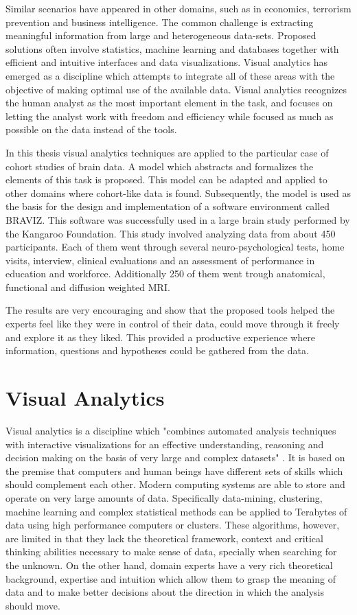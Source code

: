 Similar scenarios have appeared in other domains, such as in economics, terrorism prevention and business intelligence. The common challenge is extracting meaningful information from large and heterogeneous data-sets. Proposed solutions often involve statistics, machine learning and databases together with efficient and intuitive interfaces and data visualizations. Visual analytics has emerged as a discipline which attempts to integrate all of these areas with the objective of making optimal use of the available data. Visual analytics recognizes the human analyst as the most important element in the task, and focuses on letting the analyst work with freedom and efficiency while focused as much as possible on the data instead of the tools.

In this thesis visual analytics techniques are applied to the particular case of cohort studies of brain data. A model which abstracts and formalizes the elements of this task is proposed. This model can be adapted and applied to other domains where cohort-like data is found. Subsequently, the model is used as the basis for the design and implementation of a software environment called BRAVIZ. This software was successfully used in a large brain study performed by the Kangaroo Foundation. This study involved analyzing data from about 450 participants. Each of them went through several neuro-psychological tests, home visits, interview, clinical evaluations and an assessment of performance in education and workforce. Additionally 250 of them went trough anatomical, functional and diffusion weighted MRI.

The results are very encouraging and show that the proposed tools  helped the experts feel like they were in control of their data, could move through it freely and explore it as they liked. This provided a productive experience where information, questions and hypotheses could be gathered from the data.


\section{Visual Analytics}


Visual analytics is a discipline which "combines automated analysis techniques with interactive
visualizations for an effective understanding, reasoning and decision making on the basis of very
large and complex datasets" \autocite{cook_illuminating_2005}. It is based on the premise that computers and
human beings have different sets of skills which should complement each other. Modern
computing systems are able to store and operate on very large amounts of data.
Specifically data-mining, clustering, machine learning and complex statistical methods can be
applied to Terabytes of data using high performance computers or clusters. These
algorithms, however, are limited in that they lack the theoretical framework, context and critical
thinking abilities necessary to make sense of data, specially when searching for the unknown. 
On the other hand, domain experts have a very rich theoretical
background, expertise and intuition which allow them to grasp the meaning of data and to
make better decisions about the direction in which the analysis should move. 


